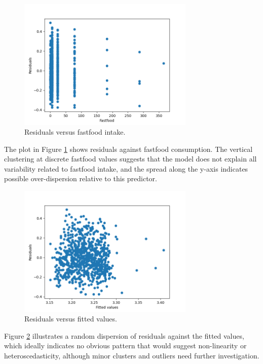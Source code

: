 \documentclass{rapport}
\begin{document}
\begin{figure}[H]
    \centering
    \includegraphics[width=0.75\textwidth]{residuals_vs_fastfood.png}
    \caption{\small Residuals versus fastfood intake.}
    \label{fig:residuals_fastfood}
\end{figure}

\noindent
The plot in Figure \ref{fig:residuals_fastfood} shows residuals against fastfood consumption. The vertical clustering at discrete fastfood values suggests that the model does not explain all variability related to fastfood intake, and the spread along the y-axis indicates possible over-dispersion relative to this predictor.

\begin{figure}[H]
    \centering
    \includegraphics[width=0.75\textwidth]{residuals_vs_fitted_values.png}
    \caption{\small Residuals versus fitted values.}
    \label{fig:residuals_fitted}
\end{figure}

\noindent
Figure \ref{fig:residuals_fitted} illustrates a random dispersion of residuals against the fitted values, which ideally indicates no obvious pattern that would suggest non-linearity or heteroscedasticity, although minor clusters and outliers need further investigation.
\end{document}

